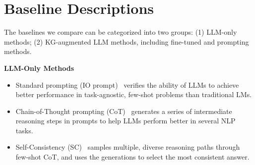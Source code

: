 \documentclass{article}
\begin{document}
\section{Baseline Descriptions}
\label{Apd:baseline}
The baselines we compare can be categorized into two groups: (1) LLM-only methods;
(2) KG-augmented LLM methods, including fine-tuned and prompting methods. 

\noindent \textbf{LLM-Only Methods}
\begin{itemize}[leftmargin=1cm] 
    \item Standard prompting (IO prompt)~\cite{brown2020language} verifies the ability of LLMs to achieve better performance in task-agnostic, few-shot problems than traditional LMs.
    \item Chain-of-Thought prompting (CoT)~\cite{wei2022chain} generates a series of intermediate reasoning steps in prompts to help LLMs perform better in several NLP tasks.
    \item Self-Consistency (SC)~\cite{wang2023self} samples multiple, diverse reasoning paths through few-shot CoT, and uses the generations to select the most consistent answer. 
\end{itemize}


\end{document}
